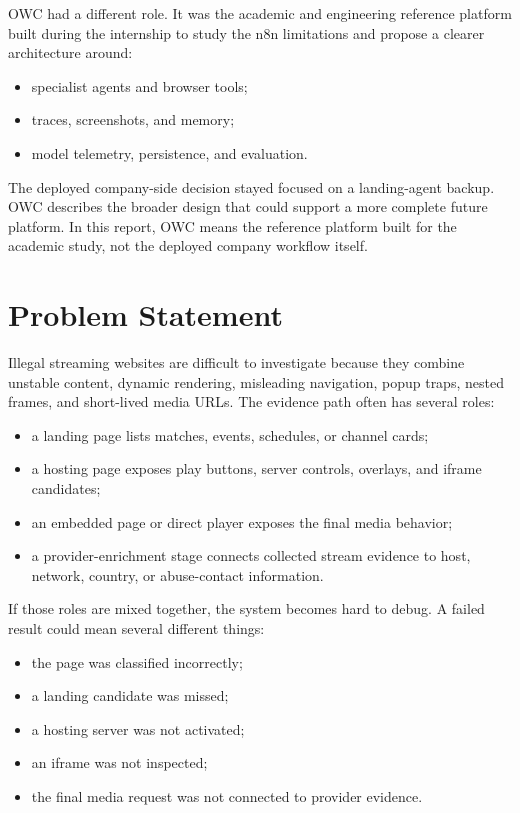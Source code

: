OWC had a different role. It was the academic and engineering reference platform built
during the internship to study the n8n limitations and propose a clearer architecture
around:
\begin{itemize}
  \item specialist agents and browser tools;
  \item traces, screenshots, and memory;
  \item model telemetry, persistence, and evaluation.
\end{itemize}

The deployed company-side decision stayed focused on a landing-agent backup. OWC
describes the broader design that could support a more complete future platform. In
this report, OWC means the reference platform built for the academic study, not the
deployed company workflow itself.

\section{Problem Statement}

Illegal streaming websites are difficult to investigate because they combine unstable
content, dynamic rendering, misleading navigation, popup traps, nested frames, and
short-lived media URLs. The evidence path often has several roles:

\begin{itemize}
  \item a landing page lists matches, events, schedules, or channel cards;
  \item a hosting page exposes play buttons, server controls, overlays, and iframe
  candidates;
  \item an embedded page or direct player exposes the final media behavior;
  \item a provider-enrichment stage connects collected stream evidence to host,
  network, country, or abuse-contact information.
\end{itemize}

If those roles are mixed together, the system becomes hard to debug. A failed result
could mean several different things:
\begin{itemize}
  \item the page was classified incorrectly;
  \item a landing candidate was missed;
  \item a hosting server was not activated;
  \item an iframe was not inspected;
  \item the final media request was not connected to provider evidence.
\end{itemize}

